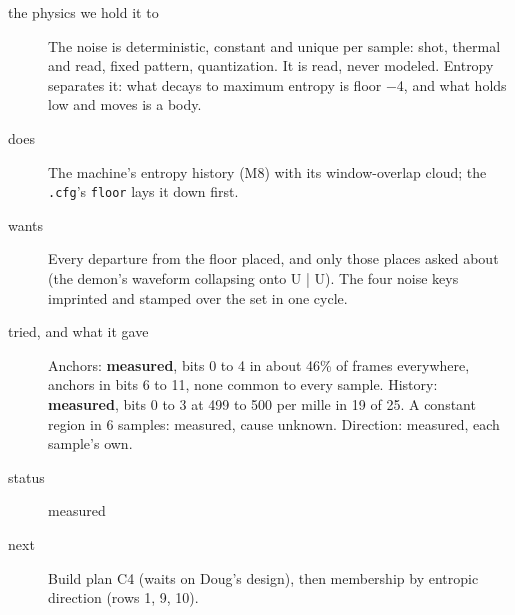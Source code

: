 \begin{description}
\item[{the physics we hold it to}] The noise is deterministic, constant and unique per sample: shot, thermal and read, fixed pattern, quantization. It is read, never modeled. Entropy separates it: what decays to maximum entropy is floor −4, and what holds low and moves is a body.
\item[{does}] The machine's entropy history (M8) with its window-overlap cloud; the \texttt{.\allowbreak{}cfg}'s \texttt{floor} lays it down first.
\item[{wants}] Every departure from the floor placed, and only those places asked about (the demon's waveform collapsing onto U | U). The four noise keys imprinted and stamped over the set in one cycle.
\item[{tried, and what it gave}] Anchors: \textbf{measured}, bits 0 to 4 in about 46\% of frames everywhere, anchors in bits 6 to 11, none common to every sample. History: \textbf{measured}, bits 0 to 3 at 499 to 500 per mille in 19 of 25. A constant region in 6 samples: measured, cause unknown. Direction: measured, each sample's own.
\item[{status}] measured
\item[{next}] Build plan C4 (waits on Doug's design), then membership by entropic direction (rows 1, 9, 10).
\end{description}


